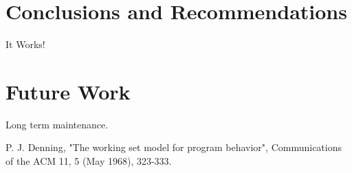 \documentclass[twoside,thesis,twoadvisors]{npsreport}
\begin{document}
\chapter{Conclusions and Recommendations}
It Works!

\chapter{Future Work}
Long term maintenance.




\begin{thebibliography}{1}  %

P. J. Denning, "The working set model for program behavior", Communications of the ACM 11, 5 (May 1968), 323-333.
  
\end{thebibliography}

\NPSend

\end{document}
